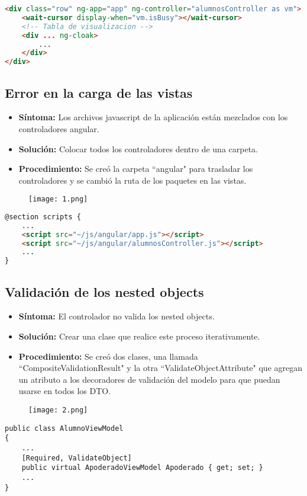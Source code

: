 \begin{lstlisting}[language=html]
<div class="row" ng-app="app" ng-controller="alumnosController as vm">
	<wait-cursor display-when="vm.isBusy"></wait-cursor>
	<!-- Tabla de visualizacion -->
	<div ... ng-cloak>
		...
	</div>
</div>
\end{lstlisting}

\subsection{Error en la carga de las vistas}
\begin{itemize}
	\item \textbf{Síntoma:} Los archivos javascript de la aplicación están mezclados con los controladores angular.
	\item \textbf{Solución:} Colocar todos los controladores dentro de una carpeta.
	\item \textbf{Procedimiento:} Se creó la carpeta ``angular" para trasladar los controladores y se cambió la ruta de los paquetes en las vistas.
\end{itemize}

\begin{figure}[h]
	\texttt{[image: 1.png]}
	\centering
\end{figure}

\begin{lstlisting}[language=html]
@section scripts {
	...
	<script src="~/js/angular/app.js"></script>
	<script src="~/js/angular/alumnosController.js"></script>
	...
}
\end{lstlisting}

\subsection{Validación de los nested objects}
\begin{itemize}
	\item \textbf{Síntoma:} El controlador no valida los nested objects.
	\item \textbf{Solución:} Crear una clase que realice este proceso iterativamente.
	\item \textbf{Procedimiento:} Se creó dos clases, una llamada ``CompositeValidationResult" y la otra ``ValidateObjectAttribute" que agregan un atributo a los decoradores de validación del modelo para que puedan usarse en todos los DTO.
\end{itemize}

\begin{figure}[h]
	\texttt{[image: 2.png]}
	\centering
\end{figure}

\begin{lstlisting}[language={[Sharp]C}]
public class AlumnoViewModel
{
	...
	[Required, ValidateObject]
	public virtual ApoderadoViewModel Apoderado { get; set; }
	...
}
\end{lstlisting}

